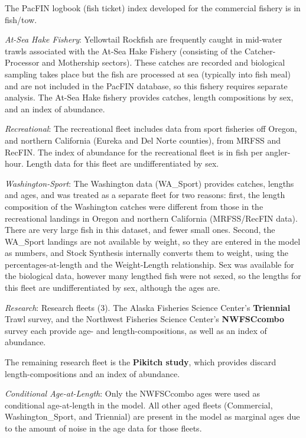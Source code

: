 \documentclass[12pt,]{article}
\begin{document}
The PacFIN logbook (fish ticket) index developed for the commercial
fishery is in fish/tow.

\emph{At-Sea Hake Fishery}: Yellowtail Rockfish are frequently caught in
mid-water trawls associated with the At-Sea Hake Fishery (consisting of
the Catcher-Processor and Mothership sectors). These catches are
recorded and biological sampling takes place but the fish are processed
at sea (typically into fish meal) and are not included in the PacFIN
database, so this fishery requires separate analysis. The At-Sea Hake
fishery provides catches, length compositions by sex, and an index of
abundance.

\emph{Recreational}: The recreational fleet includes data from sport
fisheries off Oregon, and northern California (Eureka and Del Norte
counties), from MRFSS and RecFIN. The index of abundance for the
recreational fleet is in fish per angler-hour. Length data for this
fleet are undifferentiated by sex.

\emph{Washington-Sport}: The Washington data (WA\_Sport) provides
catches, lengths and ages, and was treated as a separate fleet for two
reasons: first, the length composition of the Washington catches were
different from those in the recreational landings in Oregon and northern
California (MRFSS/RecFIN data). There are very large fish in this
dataset, and fewer small ones. Second, the WA\_Sport landings are not
available by weight, so they are entered in the model as numbers, and
Stock Synthesis internally converts them to weight, using the
percentages-at-length and the Weight-Length relationship. Sex was
available for the biological data, however many lengthed fish were not
sexed, so the lengths for this fleet are undifferentiated by sex,
although the ages are.

\emph{Research}: Research fleets (3). The Alaska Fisheries Science
Center's \textbf{Triennial} Trawl survey, and the Northwest Fisheries
Science Center's \textbf{NWFSCcombo} survey each provide age- and
length-compositions, as well as an index of abundance.

The remaining research fleet is the \textbf{Pikitch study}, which
provides discard length-compositions and an index of abundance.

\emph{Conditional Age-at-Length}: Only the NWFSCcombo ages were used as
conditional age-at-length in the model. All other aged fleets
(Commercial, Washington\_Sport, and Triennial) are present in the model
as marginal ages due to the amount of noise in the age data for those
fleets.
\end{document}

